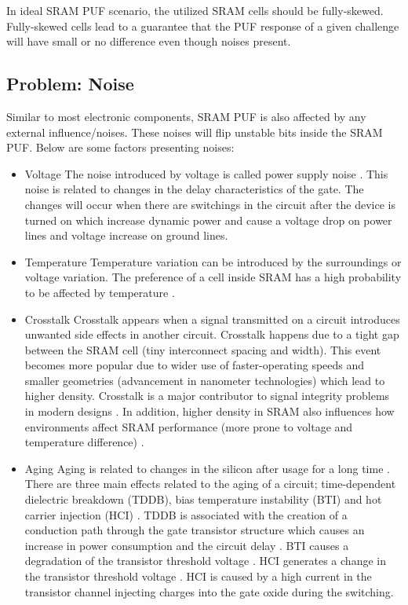 In ideal SRAM PUF scenario, the utilized SRAM cells should be fully-skewed. Fully-skewed cells lead to a guarantee that the PUF response of a given challenge will have small or no difference even though noises present.


\subsection{Problem: Noise}\label{ch:sram_noise}

Similar to most electronic components, SRAM PUF is also affected by any external influence/noises. These noises will flip unstable bits inside the SRAM PUF. Below are some factors presenting noises:

\begin{itemize}
\item Voltage\newline
The noise introduced by voltage is called power supply noise \cite{wang_tehranipoor_2010}. This noise is related to changes in the delay characteristics of the gate. The changes will occur when there are switchings in the circuit after the device is turned on which increase dynamic power and cause a voltage drop on power lines and voltage increase on ground lines.
\item Temperature\newline
Temperature variation can be introduced by the surroundings or voltage variation. The preference of a cell inside SRAM has a high probability to be affected by temperature \cite{dargar_2011}.
\item Crosstalk\newline
Crosstalk appears when a signal transmitted on a circuit introduces unwanted side effects in another circuit. Crosstalk happens due to a tight gap between the SRAM cell (tiny interconnect spacing and width). This event becomes more popular due to wider use of faster-operating speeds and smaller geometries (advancement in nanometer technologies) which lead to higher density. Crosstalk is a major contributor to signal integrity problems in modern designs \cite{wang_tehranipoor_2010}. In addition, higher density in SRAM also influences how environments affect SRAM performance (more prone to voltage and temperature difference) \cite{Abu-Rahma2013}.
\item Aging\newline
Aging is related to changes in the silicon after usage for a long time \cite{rao_mahmoodi_2011}. There are three main effects related to the aging of a circuit; time-dependent dielectric breakdown (TDDB), bias temperature instability (BTI) and hot carrier injection (HCI) \cite{Maricau2013}. TDDB is associated with the creation of a conduction path through the gate transistor structure which causes an increase in power consumption and the circuit delay \cite{impact_mosfet}.
BTI causes a degradation of the transistor threshold voltage \cite{temporal_performance}.
HCI generates a change in the transistor threshold voltage \cite{impact_hot_carriers}. HCI is caused by a high current in the transistor channel injecting charges into the gate oxide during the switching.
\end{itemize}

